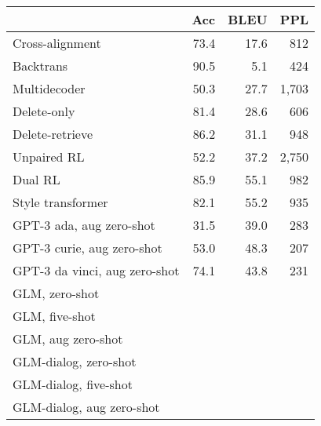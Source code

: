 
\begin{table*}
    \setlength{\tabcolsep}{2pt}
    \begin{subtable}{.58\linewidth}
    \centering \small 
        \begin{tabular}{l r r r}
        \toprule
         & Acc & BLEU & PPL\\
        \midrule
        Cross-alignment \citep{NIPS2017_2d2c8394} & 73.4 & 17.6 & 812 \\
        Backtrans \citep{prabhumoye-etal-2018-style} & 90.5 & 5.1 & 424 \\
        Multidecoder \citep{AAAI1817015}  & 50.3 & 27.7 & 1,703\\
        Delete-only \citep{li-etal-2018-delete} & 81.4 & 28.6 & 606 \\
        Delete-retrieve \citep{li-etal-2018-delete} & 86.2 & 31.1 & 948\\
        Unpaired RL \citep{xu-etal-2018-unpaired} & 52.2 & 37.2 & 2,750\\
        Dual RL \citep{DBLP:conf/ijcai/LuoLZYCSS19} & 85.9 & 55.1 & 982\\
        Style transformer \citep{dai-etal-2019-style} & 82.1 & 55.2 & 935\\
        \midrule
        GPT-3 ada, aug zero-shot& 31.5 & 39.0 & 283\\
        GPT-3 curie, aug zero-shot& 53.0 & 48.3 & 207\\
        GPT-3 da vinci, aug zero-shot& 74.1 & 43.8 & 231\\
        \midrule
        GLM, zero-shot \\ 
        GLM, five-shot \\
        GLM, aug zero-shot \\
        \midrule
        GLM-dialog, zero-shot \\
        GLM-dialog, five-shot \\
        GLM-dialog, aug zero-shot \\
        \bottomrule
        \end{tabular}
        \label{tab:prior-methods}
        \caption{}

\end{subtable}
\end{table*}
